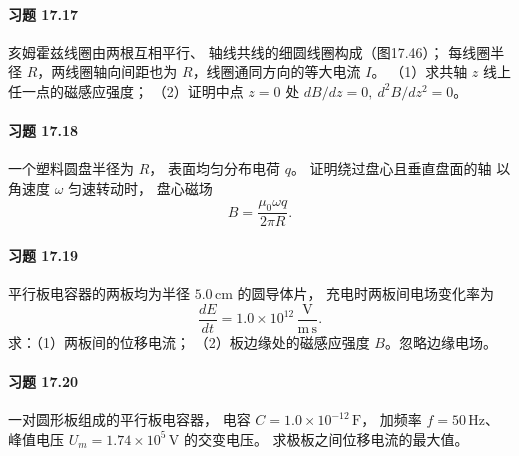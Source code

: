 \paragraph{习题 17.17}
亥姆霍兹线圈由两根互相平行、
轴线共线的细圆线圈构成（图17.46）；
每线圈半径 \(R\)，两线圈轴向间距也为
\(R\)，线圈通同方向的等大电流 \(I\)。
（1）求共轴 \(z\) 线上任一点的磁感应强度；
（2）证明中点 \(z=0\) 处
\(dB/dz=0,\ d^2B/dz^2=0\)。

\paragraph{习题 17.18}
一个塑料圆盘半径为 \(R\)，
表面均匀分布电荷 \(q\)。
证明绕过盘心且垂直盘面的轴
以角速度 \(\omega\) 匀速转动时，
盘心磁场
\[
 \boxed{B=\frac{\mu_0\omega q}{2\pi R}}.
\]

\paragraph{习题 17.19}
平行板电容器的两板均为半径
\(5.0\,\mathrm{cm}\) 的圆导体片，
充电时两板间电场变化率为
\[
 \frac{dE}{dt}=1.0\times10^{12}\,
 \mathrm{\frac{V}{m\,s}}.
\]
求：（1）两板间的位移电流；
（2）板边缘处的磁感应强度
\(B\)。忽略边缘电场。

\paragraph{习题 17.20}
一对圆形板组成的平行板电容器，
电容 \(C=1.0\times10^{-12}\,\mathrm F\)，
加频率 \(f=50\,\mathrm{Hz}\)、
峰值电压 \(U_m=1.74\times10^5\,\mathrm V\)
的交变电压。
求极板之间位移电流的最大值。
